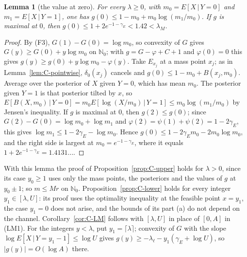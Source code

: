 \documentclass[10pt,letterpaper]{article}
\newtheorem{lemma}[theorem]{Lemma}
\begin{document}
\begin{lemma}[the value at zero]\label{lem:C-zero}
For every $\lambda\ge0$, with $m_0=E[X\,|\,Y=0]$ and $m_1=E[X\,|\,Y=1]$, one has $g(0)\le1-m_0+m_0\log(m_1/m_0)$. If $g$ is maximal
at $0$, then $g(0)\le1+2e^{-1-\gamma_E}<1.42<\lambda_M$.
\end{lemma}
\begin{proof}
By (F3), $G(1)-G(0)=\log m_0$, so convexity of $G$ gives $G(y)\ge G(0)+y\log m_0$ on $\mathbb N_0$; with $g=G-\varphi+C+1$ and
$\varphi(0)=0$ this gives $g(y)\ge g(0)+y\log m_0-\varphi(y)$. Take $E_{x_j}$ at a mass point $x_j$; as in Lemma~\ref{lem:C-pointwise},
$\delta_0(x_j)$ cancels and $g(0)\le1-m_0+B(x_j,m_0)$. Average over the posterior of $X$ given $Y=0$, which has mean $m_0$. The posterior
given $Y=1$ is that posterior tilted by $x$, so $E[B(X,m_0)\,|\,Y=0]=m_0E[\log(X/m_0)\,|\,Y=1]\le m_0\log(m_1/m_0)$ by Jensen's
inequality. If $g$ is maximal at $0$, then $g(2)\le g(0)$; since $G(2)-G(0)=\log m_0+\log m_1$ and $\varphi(2)=\psi(1)+\psi(2)=1-2\gamma_E$,
this gives $\log m_1\le1-2\gamma_E-\log m_0$. Hence $g(0)\le1-2\gamma_Em_0-2m_0\log m_0$, and the right side is largest at
$m_0=e^{-1-\gamma_E}$, where it equals $1+2e^{-1-\gamma_E}=1.4131\ldots$.
\end{proof}

With this lemma the proof of Proposition~\ref{prop:C-upper} holds for $\lambda>0$, since its case $y_0\ge1$ uses only the mass points,
the posteriors and the values of $g$ at $y_0\pm1$; so $m\le Mr$ on $\mathbb N_0$. Proposition~\ref{prop:C-lower} holds for every integer
$y_1\in[\lambda,U]$: its proof uses the optimality inequality at the feasible point $x=y_1$, the case $y_1=0$ does not arise, and the
bounds of its part (a) do not depend on the channel. Corollary~\ref{cor:C-LM} follows with $[\lambda,U]$ in place of $[0,A]$ in (LM1).
For the integers $y<\lambda$, put $y_1=\lceil\lambda\rceil$; convexity of $G$ with the slope $\log E[X\,|\,Y=y_1-1]\le\log U$ gives
$g(y)\ge-\lambda_\ell-y_1(\gamma_E+\log U)$, so $|g(y)|=O(\log A)$ there.
\end{document}
